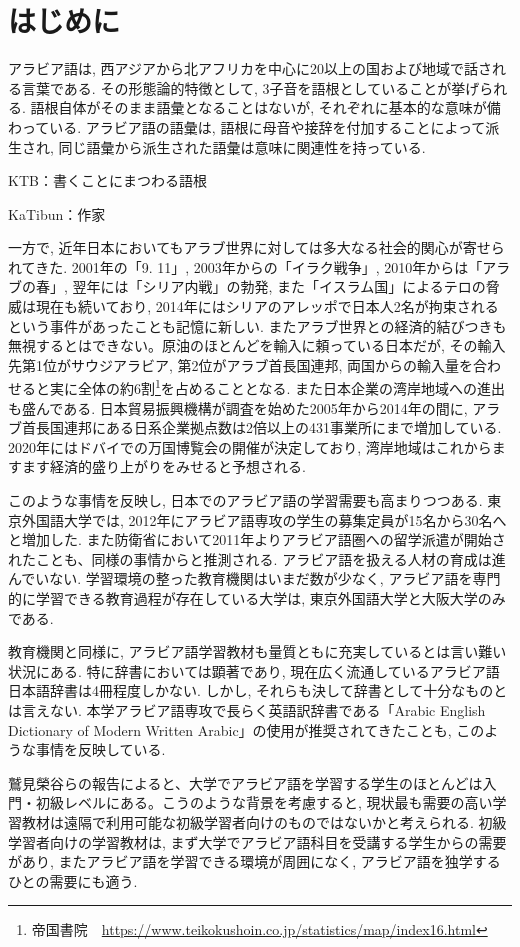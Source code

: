 \documentclass[technicalreport]{ieicej}
\begin{document}
\section{はじめに}
アラビア語は, 西アジアから北アフリカを中心に20以上の国および地域で話される言葉である. その形態論的特徴として, 3子音を語根としていることが挙げられる. 語根自体がそのまま語彙となることはないが, それぞれに基本的な意味が備わっている. アラビア語の語彙は, 語根に母音や接辞を付加することによって派生され, 同じ語彙から派生された語彙は意味に関連性を持っている.

KTB：書くことにまつわる語根

KaTibun：作家

一方で, 近年日本においてもアラブ世界に対しては多大なる社会的関心が寄せられてきた. 2001年の「9. 11」, 2003年からの「イラク戦争」, 2010年からは「アラブの春」, 翌年には「シリア内戦」の勃発, また「イスラム国」によるテロの脅威は現在も続いており, 2014年にはシリアのアレッポで日本人2名が拘束されるという事件があったことも記憶に新しい. またアラブ世界との経済的結びつきも無視するとはできない。原油のほとんどを輸入に頼っている日本だが, その輸入先第1位がサウジアラビア, 第2位がアラブ首長国連邦, 両国からの輸入量を合わせると実に全体の約6割\footnote{帝国書院　\url{https://www.teikokushoin.co.jp/statistics/map/index16.html}}を占めることとなる. また日本企業の湾岸地域への進出も盛んである. 日本貿易振興機構が調査を始めた2005年から2014年の間に, アラブ首長国連邦にある日系企業拠点数は2倍以上の431事業所にまで増加している. 2020年にはドバイでの万国博覧会の開催が決定しており, 湾岸地域はこれからますます経済的盛り上がりをみせると予想される. 

このような事情を反映し, 日本でのアラビア語の学習需要も高まりつつある. 東京外国語大学では, 2012年にアラビア語専攻の学生の募集定員が15名から30名へと増加した. また防衛省において2011年よりアラビア語圏への留学派遣が開始されたことも、同様の事情からと推測される. アラビア語を扱える人材の育成は進んでいない. 学習環境の整った教育機関はいまだ数が少なく, アラビア語を専門的に学習できる教育過程が存在している大学は, 東京外国語大学と大阪大学のみである. 

教育機関と同様に, アラビア語学習教材も量質ともに充実しているとは言い難い状況にある. 特に辞書においては顕著であり, 現在広く流通しているアラビア語日本語辞書は4冊程度しかない. しかし, それらも決して辞書として十分なものとは言えない. 本学アラビア語専攻で長らく英語訳辞書である「Arabic English Dictionary of Modern Written Arabic」の使用が推奨されてきたことも, このような事情を反映している.

鷲見榮谷\cite{washimi2016}らの報告によると、大学でアラビア語を学習する学生のほとんどは入門・初級レベルにある。こうのような背景を考慮すると, 現状最も需要の高い学習教材は遠隔で利用可能な初級学習者向けのものではないかと考えられる. 初級学習者向けの学習教材は, まず大学でアラビア語科目を受講する学生からの需要があり, またアラビア語を学習できる環境が周囲になく, アラビア語を独学するひとの需要にも適う.
\end{document}
